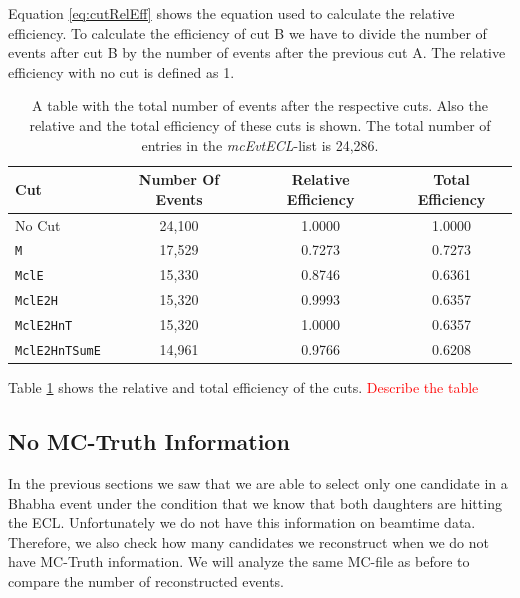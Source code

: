 \documentclass[a4paper,11pt,twosided,final,german,openbib,pdftex,listof=totoc,bibliography=totoc]{scrbook}
\begin{document}
Equation \ref{eq:cutRelEff} shows the equation used to calculate the relative efficiency. To calculate the efficiency of cut B we have to divide the number of events after cut B by the number of events after the previous
cut A. The relative efficiency with no cut is defined as 1.

\begin{table}[h!]
	\centering
\begin{tabular}{lccc}
 Cut& Number Of Events&  Relative Efficiency& Total Efficiency\\
 \hline
 No Cut&24,100 &1.0000 &1.0000 \\
 \texttt{M}& 17,529&0.7273 &0.7273 \\
 \texttt{MclE}&15,330 &0.8746 &0.6361 \\
 \texttt{MclE2H}&15,320&0.9993  &0.6357 \\
 \texttt{MclE2HnT}&15,320 &1.0000 &0.6357 \\
 \texttt{MclE2HnTSumE}& 14,961 &0.9766 &0.6208 \\

\end{tabular}

\caption[Cut Efficiencies]{A table with the total number of events after the respective cuts. Also the relative and the total efficiency of these cuts is shown. The total number of entries in the \textit{mcEvtECL}-list is 24,286.}
\label{tab:cutEff}
\end{table}

Table \ref{tab:cutEff} shows the relative and total efficiency of the cuts.
\textcolor{red}{Describe the table}

\subsection{No MC-Truth Information}
\label{sec:NoMCT}

In the previous sections we saw that we are able to select only one candidate in a Bhabha event under the condition that we know that both daughters are hitting the ECL. Unfortunately we do not have this information on beamtime data. Therefore, we also check how many candidates we reconstruct when we do not have MC-Truth information. We will analyze the same MC-file as before to compare the number of reconstructed events. 
\end{document}
